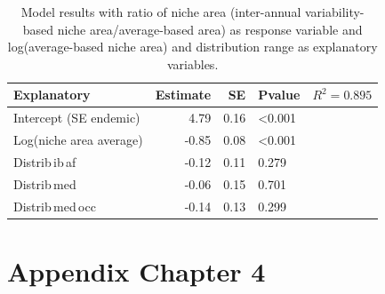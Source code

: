 \documentclass[11pt,twoside]{reedthesis}
\begin{document}
\par
\begin{table}[H]

\caption[Model results relating relating ratio of niche area and niche average size]{\label{tab:unnamed-chunk-16}Model results with ratio of niche area (inter-annual variability-based niche area/average-based area) as response variable and log(average-based niche area) and distribution range as explanatory variables. }
\centering
\fontsize{8}{10}\selectfont
\begin{tabular}[t]{lrrll}
\toprule
Explanatory & Estimate & SE & Pvalue & $R^2 = 0.895$\\
\midrule
Intercept (SE endemic) & 4.79 & 0.16 & <0.001 & \\
Log(niche area average) & -0.85 & 0.08 & <0.001 & \\
Distrib\,ib\,af & -0.12 & 0.11 & 0.279 & \\
Distrib\,med & -0.06 & 0.15 & 0.701 & \\
Distrib\,med\,occ & -0.14 & 0.13 & 0.299 & \\
\bottomrule
\end{tabular}
\end{table}
\chapter{Appendix Chapter 4}\label{appendix-chapter-4}

\newpage
\end{document}
